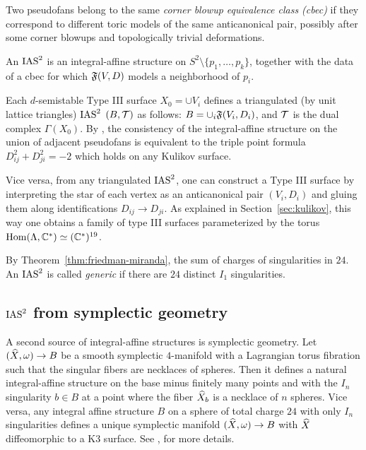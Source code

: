 \documentclass{amsart}
\begin{document}
\begin{definition}\label{def:cbec}
  Two pseudofans belong to the same \emph{corner blowup equivalence
    class (cbec)} if they correspond to different toric models of
  the same anticanonical pair, possibly after some corner blowups and topologically
  trivial deformations.
\end{definition}

\begin{definition}\label{def:ias}
  An $\operatorname{IAS}^2$ is an integral-affine structure on
  $S^2\setminus \{p_1,\dotsc, p_k\}$, together with
  the data of a cbec for which ${\mathfrak F}(V,D)$ models a neighborhood of $p_i$.
    \end{definition}

\begin{construction}\label{con:ias-from-kulikov}
  Each $d$-semistable Type III surface $X_0=\cup V_i$ defines a
  triangulated (by unit lattice triangles) $\operatorname{IAS}^2$ $(B,{\mathcal T})$ as follows: $B= \cup_i {\mathfrak F}(V_i,D_i)$, and
  ${\mathcal T}$ is the dual complex $\Gamma(X_0)$. By
  \cite[Prop.~2.2]{engel2018looijenga}, the consistency of the
  integral-affine structure on the union of adjacent pseudofans
  is equivalent to the triple point formula $D_{ij}^2 + D_{ji}^2=-2$ which
  holds on any Kulikov surface.
  
  Vice versa, from any triangulated $\operatorname{IAS}^2$, one can
  construct a Type III surface by interpreting the star of each vertex as
  an anticanonical pair $(V_i,D_i)$ and gluing them along
  identifications $D_{ij}\to D_{ji}$. As explained in
  Section~\ref{sec:kulikov}, this way one obtains a family of type III
  surfaces parameterized by the torus
  $\operatorname{Hom}(\Lambda,{\mathbb C}^*) \simeq ({\mathbb C}^*)^{19}$.
\end{construction}


  By Theorem~\ref{thm:friedman-miranda}, the sum of charges of
  singularities in $24$. An $\operatorname{IAS}^2$ is called \emph{generic} if there
  are $24$ distinct $I_1$ singularities.

\subsection{$\operatorname{IAS}^2$ from symplectic geometry}
\label{sec:ias-symplectic}

A second source of integral-affine structures is symplectic geometry.
Let $({\widehat X},\omega)\to B$ be a smooth symplectic $4$-manifold with a
Lagrangian torus fibration such that the singular fibers are necklaces
of spheres. Then it defines a natural integral-affine structure on the
base minus finitely many points and with the $I_n$ singularity
$b\in B$ at a point where the fiber ${\widehat X}_b$ is a necklace of $n$
spheres. Vice versa, any integral affine structure $B$ on a sphere of
total charge $24$ with only $I_n$ singularities defines a unique
symplectic manifold $({\widehat X},\omega)\to B$ with ${\widehat X}$ diffeomorphic to a
K3 surface.  See \cite{engel2021smoothings},
\cite[Sec.~8E]{alexeev2019stable-pair} for more details.
\end{document}
